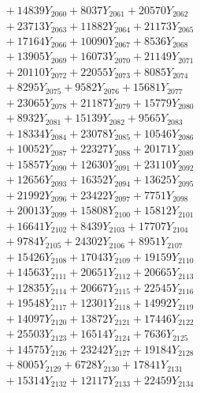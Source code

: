 \documentclass[a4paper,10pt]{article}
\begin{document}
{\begin{align}
&\;  + 14839 Y_{2060} + 8037 Y_{2061} + 20570 Y_{2062} \\[0.3ex]
&\;  + 23713 Y_{2063} + 11882 Y_{2064} + 21173 Y_{2065} \\[0.3ex]
&\;  + 17164 Y_{2066} + 10090 Y_{2067} + 8536 Y_{2068} \\[0.5ex]\allowbreak
&\;  + 13905 Y_{2069} + 16073 Y_{2070} + 21149 Y_{2071} \\[0.3ex]
&\;  + 20110 Y_{2072} + 22055 Y_{2073} + 8085 Y_{2074} \\[0.3ex]
&\;  + 8295 Y_{2075} + 9582 Y_{2076} + 15681 Y_{2077} \\[0.3ex]
&\;  + 23065 Y_{2078} + 21187 Y_{2079} + 15779 Y_{2080} \\[0.3ex]
&\;  + 8932 Y_{2081} + 15139 Y_{2082} + 9565 Y_{2083} \\[0.3ex]
&\;  + 18334 Y_{2084} + 23078 Y_{2085} + 10546 Y_{2086} \\[0.3ex]
&\;  + 10052 Y_{2087} + 22327 Y_{2088} + 20171 Y_{2089} \\[0.3ex]
&\;  + 15857 Y_{2090} + 12630 Y_{2091} + 23110 Y_{2092} \\[0.3ex]
&\;  + 12656 Y_{2093} + 16352 Y_{2094} + 13625 Y_{2095} \\[0.3ex]
&\;  + 21992 Y_{2096} + 23422 Y_{2097} + 7751 Y_{2098} \\[0.5ex]\allowbreak
&\;  + 20013 Y_{2099} + 15808 Y_{2100} + 15812 Y_{2101} \\[0.3ex]
&\;  + 16641 Y_{2102} + 8439 Y_{2103} + 17707 Y_{2104} \\[0.3ex]
&\;  + 9784 Y_{2105} + 24302 Y_{2106} + 8951 Y_{2107} \\[0.3ex]
&\;  + 15426 Y_{2108} + 17043 Y_{2109} + 19159 Y_{2110} \\[0.3ex]
&\;  + 14563 Y_{2111} + 20651 Y_{2112} + 20665 Y_{2113} \\[0.3ex]
&\;  + 12835 Y_{2114} + 20667 Y_{2115} + 22545 Y_{2116} \\[0.3ex]
&\;  + 19548 Y_{2117} + 12301 Y_{2118} + 14992 Y_{2119} \\[0.3ex]
&\;  + 14097 Y_{2120} + 13872 Y_{2121} + 17446 Y_{2122} \\[0.3ex]
&\;  + 25503 Y_{2123} + 16514 Y_{2124} + 7636 Y_{2125} \\[0.3ex]
&\;  + 14575 Y_{2126} + 23242 Y_{2127} + 19184 Y_{2128} \\[0.5ex]\allowbreak
&\;  + 8005 Y_{2129} + 6728 Y_{2130} + 17841 Y_{2131} \\[0.3ex]
&\;  + 15314 Y_{2132} + 12117 Y_{2133} + 22459 Y_{2134} \\[0.3ex]

\end{align}}
\end{document}
